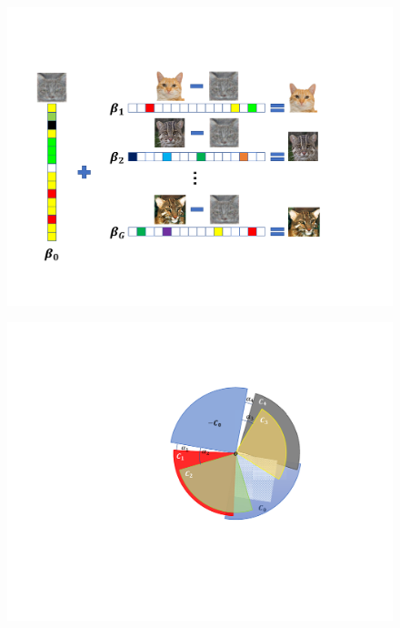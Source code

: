 \newlength\heightfiga\newlength\heightcapa
\newlength\heightfigb\newlength\heightcapb
\newlength\heightfigc\newlength\heightcapc
\newlength\heightfig

\begin{figure}
	\setlength\heightfiga{3cm}
	\setlength\heightfigb{3cm}
	\setlength{}
	\setlength{}
	\setlength\heightcapc{\heightcapa}
	\setlength\heightfigc{\heightfiga+\heightfigb+\heightcapa}
	\setlength\heightfig{\heightfigc+\heightcapc}
	\begin{minipage}[b][\heightfig][t]{0.68\linewidth}
		\centering
		\includegraphics[height=\heightfigc]{./img/concept}
		\parbox[b][\heightcapc][t]{1.\linewidth}{\label{subfig3}}
	\end{minipage}	\hfill
	\begin{minipage}[b][\heightfig][t]{0.3\linewidth}\centering
		\includegraphics[height=\heightfiga]{./img/sc.pdf}

\end{minipage}
\end{figure}

